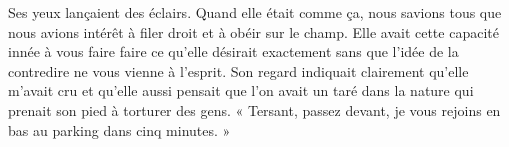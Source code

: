 Ses yeux lançaient des éclairs. Quand elle était comme ça, nous savions tous que nous avions intérêt à filer droit et à
obéir sur le champ. Elle avait cette capacité innée à vous faire faire ce qu'elle désirait exactement sans que l'idée 
de la contredire ne vous vienne à l'esprit. Son regard indiquait clairement qu'elle m'avait cru et qu'elle aussi 
pensait que l'on avait un taré dans la nature qui prenait son pied à torturer des gens. « Tersant, passez devant, je 
vous rejoins en bas au parking dans cinq minutes. »
